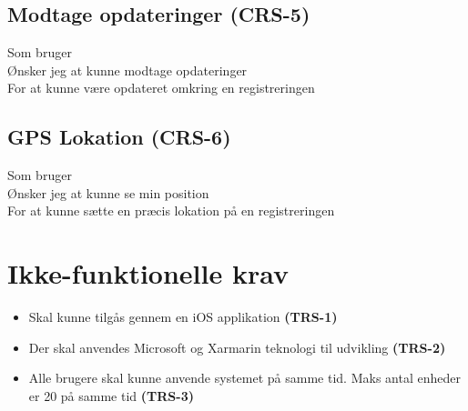 	\subsection*{Modtage opdateringer (CRS-5)}
	Som bruger\\
	Ønsker jeg at kunne modtage opdateringer\\
	For at kunne være opdateret omkring en registreringen
	
	\subsection*{GPS Lokation (CRS-6)}
	Som bruger\\
	Ønsker jeg at kunne se min position\\
	For at kunne sætte en præcis lokation på en registreringen
	
	\newpage
	\section{Ikke-funktionelle krav}
	\begin{itemize}[-]
		\itemsep 0.3em 
		\item Skal kunne tilgås gennem en iOS applikation \textbf{(TRS-1)}
		\item Der skal anvendes Microsoft og Xarmarin teknologi til udvikling \textbf{(TRS-2)}
		\item Alle brugere skal kunne anvende systemet på samme tid. Maks antal enheder er 20 på samme tid \textbf{(TRS-3)}
	\end{itemize}
	